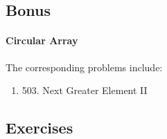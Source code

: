 \documentclass[../main.tex]{subfiles}
\begin{document}
\subsection{Bonus} 
\paragraph{Circular Array}
The corresponding problems include:
\begin{enumerate}
    \item 503. Next Greater Element II
\end{enumerate}


\subsection{Exercises }
\end{document}
